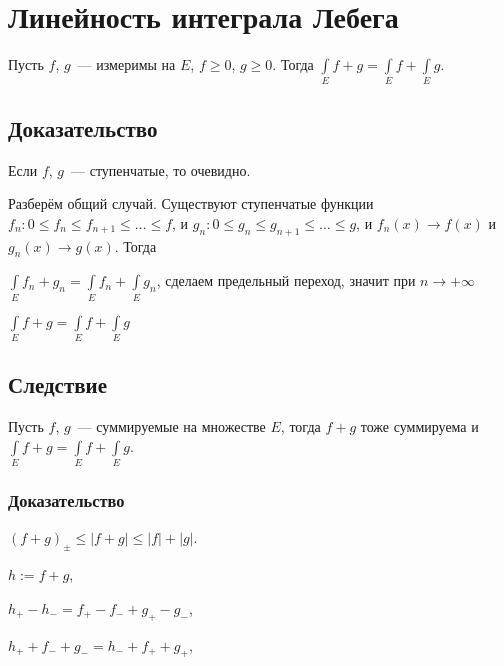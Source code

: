 \documentclass{article}
\begin{document}
    \newpage
    
    \section{Линейность интеграла Лебега}
    
        Пусть $f$, $g$~--- измеримы на $E$, $f \geqslant 0$, $g \geqslant 0$. Тогда $\int\limits_{E} f + g = \int\limits_{E} f + \int\limits_{E} g$.
        
        \subsection{Доказательство}
        
            Если $f$, $g$~--- ступенчатые, то очевидно.
            
            Разберём общий случай. Существуют ступенчатые функции $f_n : 0 \leqslant f_n \leqslant f_{n + 1} \leqslant \ldots \leqslant f$, и $g_n : 0 \leqslant g_n \leqslant g_{n + 1} \leqslant \ldots \leqslant g$, и $f_n(x) \rightarrow f(x)$ и $g_n(x) \rightarrow g(x)$. Тогда
            
            $\int\limits_{E} f_n + g_n = \int\limits_{E} f_n + \int\limits_{E} g_n$, сделаем предельный переход, значит при $n \rightarrow +\infty$
            
            $\int\limits_{E} f + g = \int\limits_{E} f + \int\limits_{E} g$
            
        \subsection{Следствие}
        
            Пусть $f$, $g$~--- суммируемые на множестве $E$, тогда $f + g$ тоже суммируема и $\int\limits_{E} f + g = \int\limits_{E} f + \int\limits_{E} g$.
            
            \subsubsection{Доказательство}
            
                $(f + g)_{\pm} \leqslant | f + g | \leqslant |f| + |g|$.
                
                $h := f + g$,
                
                $h_+ - h_- = f_+ - f_- + g_+ - g_-$,
                
                $h_+ + f_- + g_- = h_- + f_+ + g_+$,
                
\end{document}
